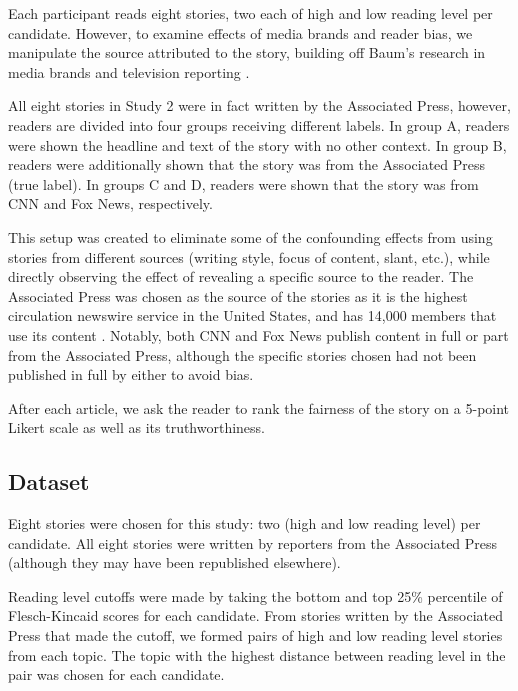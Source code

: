 Each participant reads eight stories, two each of high and low reading level per candidate. However, to examine effects of media brands and reader bias, we manipulate the source attributed to the story, building off Baum's research in media brands and television reporting \cite{baum2008eye}.

All eight stories in Study 2 were in fact written by the Associated Press, however, readers are divided into four groups receiving different labels. In group A, readers were shown the headline and text of the story with no other context. In group B, readers were additionally shown that the story was from the Associated Press (true label). In groups C and D, readers were shown that the story was from CNN and Fox News, respectively.

This setup was created to eliminate some of the confounding effects from using stories from different sources (writing style, focus of content, slant, etc.), while directly observing the effect of revealing a specific source to the reader. The Associated Press was chosen as the source of the stories as it is the highest circulation newswire service in the United States, and has 14,000 members that use its content \cite{apFAQ}. Notably, both CNN and Fox News publish content in full or part from the Associated Press, although the specific stories chosen had not been published in full by either to avoid bias.

After each article, we ask the reader to rank the fairness of the story on a 5-point Likert scale as well as its truthworthiness.

\subsection{Dataset} 
Eight stories were chosen for this study: two (high and low reading level) per candidate. All eight stories were written by reporters from the Associated Press (although they may have been republished elsewhere).

Reading level cutoffs were made by taking the bottom and top 25\% percentile of Flesch-Kincaid scores for each candidate. From stories written by the Associated Press that made the cutoff, we formed pairs of high and low reading level stories from each topic. The topic with the highest distance between reading level in the pair was chosen for each candidate.


 
 
